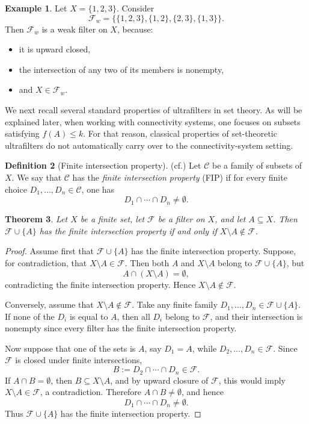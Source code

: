 \documentclass[10pt]{book}
\newtheorem{theorem}{Theorem}[section]
\theoremstyle{definition}
\newtheorem{definition}[theorem]{Definition}
\newtheorem{example}[theorem]{Example}
\begin{document}
\begin{example}
Let \(X=\{1,2,3\}\).  
Consider
\[
\mathcal{F}_w=\bigl\{\{1,2,3\},\{1,2\},\{2,3\},\{1,3\}\bigr\}.
\]
Then \(\mathcal{F}_w\) is a weak filter on \(X\), because:
\begin{itemize}
    \item it is upward closed,
    \item the intersection of any two of its members is nonempty,
    \item and \(X\in\mathcal{F}_w\).
\end{itemize}
\end{example}

We next recall several standard properties of ultrafilters in set theory.  
As will be explained later, when working with connectivity systems, one focuses on subsets satisfying \(f(A)\leq k\).  
For that reason, classical properties of set-theoretic ultrafilters do not automatically carry over to the connectivity-system setting.

\begin{definition}[Finite intersection property] (cf.\cite{huang2018finite})
Let \(\mathcal{C}\) be a family of subsets of \(X\).  
We say that \(\mathcal{C}\) has the \emph{finite intersection property} (FIP) if for every finite choice \(D_1,\dots,D_n\in\mathcal{C}\), one has
\[
D_1\cap \cdots \cap D_n\neq\emptyset.
\]
\end{definition}

\begin{theorem}
Let \(X\) be a finite set, let \(\mathcal{F}\) be a filter on \(X\), and let \(A\subseteq X\).  
Then \(\mathcal{F}\cup\{A\}\) has the finite intersection property if and only if \(X\setminus A\notin\mathcal{F}\).
\end{theorem}

\begin{proof}
Assume first that \(\mathcal{F}\cup\{A\}\) has the finite intersection property.  
Suppose, for contradiction, that \(X\setminus A\in\mathcal{F}\).  
Then both \(A\) and \(X\setminus A\) belong to \(\mathcal{F}\cup\{A\}\), but
\[
A\cap (X\setminus A)=\emptyset,
\]
contradicting the finite intersection property.  
Hence \(X\setminus A\notin\mathcal{F}\).

Conversely, assume that \(X\setminus A\notin\mathcal{F}\).  
Take any finite family \(D_1,\dots,D_n\in\mathcal{F}\cup\{A\}\).  
If none of the \(D_i\) is equal to \(A\), then all \(D_i\) belong to \(\mathcal{F}\), and their intersection is nonempty since every filter has the finite intersection property.

Now suppose that one of the sets is \(A\), say \(D_1=A\), while \(D_2,\dots,D_n\in\mathcal{F}\).  
Since \(\mathcal{F}\) is closed under finite intersections,
\[
B:=D_2\cap \cdots \cap D_n \in \mathcal{F}.
\]
If \(A\cap B=\emptyset\), then \(B\subseteq X\setminus A\), and by upward closure of \(\mathcal{F}\), this would imply \(X\setminus A\in\mathcal{F}\), a contradiction.  
Therefore \(A\cap B\neq\emptyset\), and hence
\[
D_1\cap \cdots \cap D_n\neq\emptyset.
\]
Thus \(\mathcal{F}\cup\{A\}\) has the finite intersection property.
\end{proof}
\end{document}
